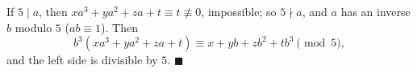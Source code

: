 If $5\mid a$, then $xa^3+ya^2+za+t\equiv t\not\equiv0$, impossible; so $5\nmid a$, and $a$ has an inverse $b$ modulo $5$ ($ab\equiv1$). Then
\[b^3\left(xa^3+ya^2+za+t\right)\equiv x+yb+zb^2+tb^3\pmod5,\]
and the left side is divisible by $5$. $\blacksquare$

